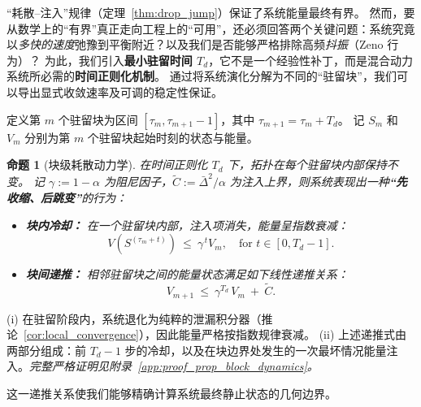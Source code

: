 \documentclass[journal]{IEEEtran}
\theoremstyle{plain}
\newtheorem{proposition}{命题}
\theoremstyle{definition}
\begin{document}
“耗散--注入”规律（定理~\ref{thm:drop_jump}）保证了系统能量最终有界。
然而，要从数学上的“有界”真正走向工程上的“可用”，还必须回答两个关键问题：系统究竟以\textit{多快的速度}弛豫到平衡附近？以及我们是否能够严格排除高频\textit{抖振}（Zeno 行为）？
为此，我们引入\textbf{最小驻留时间 $T_d$}，它不是一个经验性补丁，而是混合动力系统所必需的\textbf{时间正则化机制}。
通过将系统演化分解为不同的“驻留块”，我们可以导出显式收敛速率及可调的稳定性保证。

定义第 $m$ 个驻留块为区间 $[\tau_m, \tau_{m+1}-1]$，其中 $\tau_{m+1} = \tau_m + T_d$。
记 $S_m$ 和 $V_m$ 分别为第 $m$ 个驻留块起始时刻的状态与能量。

\begin{proposition}[块级耗散动力学]
\label{prop:block_dynamics}
在时间正则化 $T_d$ 下，拓扑在每个驻留块内部保持不变。
记 $\gamma:=1-\alpha$ 为阻尼因子，$\tilde C:=\bar\Delta^2/\alpha$ 为注入上界，则系统表现出一种\textbf{“先收缩、后跳变”}的行为：
\begin{itemize}
    \item[\textit{(i)}] \textbf{块内冷却：} 在一个驻留块内部，注入项消失，能量呈指数衰减：
    \begin{equation}\label{eq:intra_block}
    V(S^{(\tau_m+t)})\ \le\ \gamma^{\,t}V_m, \quad \text{for } t \in [0, T_d-1].
    \end{equation}
    \item[\textit{(ii)}] \textbf{块间递推：} 相邻驻留块之间的能量状态满足如下线性递推关系：
    \begin{equation}\label{eq:inter_block}
    V_{m+1}\ \le\ \gamma^{T_d}\,V_m\ +\ \tilde C.
    \end{equation}
\end{itemize}
\end{proposition}
\begin{IEEEproof}[证明思路]
(i) 在驻留阶段内，系统退化为纯粹的泄漏积分器（推论~\ref{cor:local_convergence}），因此能量严格按指数规律衰减。
(ii) 上述递推式由两部分组成：前 $T_d-1$ 步的冷却，以及在块边界处发生的一次最坏情况能量注入。\textit{完整严格证明见附录~\ref{app:proof_prop_block_dynamics}。}
\end{IEEEproof}

这一递推关系使我们能够精确计算系统最终静止状态的几何边界。
\end{document}
